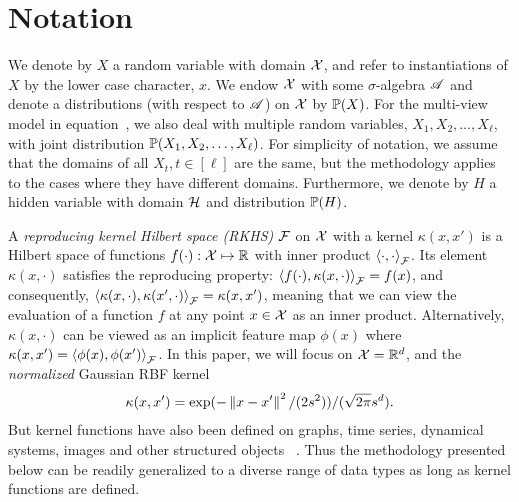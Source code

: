 \documentclass{article}
\begin{document}
\vspace{-3mm}
\section{Notation}
\vspace{-3mm}

We  denote by $X$ a random variable with domain $\mathcal{X}$,
and refer to instantiations of $X$ by the lower case character, $x$.
We endow $\mathcal{X}$ with some $\sigma$-algebra $\mathscr{A}$ and denote a distributions (with respect to $\mathscr{A}$) on $\mathcal{X}$ by $\mathbb{P}(X)$. For the multi-view model in equation~, we also deal with multiple random variables, $X_1, X_2, \ldots, X_{\ell}$, with joint distribution $\mathbb{P}(X_1,X_2,\ldots,X_{\ell})$. For simplicity of notation, we assume that the domains of all $X_t, t \in [\ell]$ are the same, but the methodology applies to the cases where they have different domains. Furthermore, we denote by $H$ a hidden variable with domain $\mathcal{H}$ and distribution $\mathbb{P}(H)$.

A \emph{reproducing kernel Hilbert space (RKHS)} $\mathcal{F}$ on $\mathcal{X}$ with a kernel $\kappa(x,x')$ is a Hilbert space of
functions $f(\cdot):\mathcal{X} \mapsto \mathbb{R}$ with inner product $\left\langle \cdot,\cdot \right\rangle_{\mathcal{F}}$. Its element $\kappa(x,\cdot)$ satisfies the reproducing property:
$\left\langle f(\cdot),\kappa(x, \cdot) \right\rangle_{\mathcal{F}} = f(x)$, and consequently, $\left\langle \kappa(x,\cdot),\kappa(x', \cdot) \right\rangle_{\mathcal{F}} = \kappa(x,x')$,
meaning that we can view the evaluation of a function $f$ at any point $x\in\mathcal{X}$ as an inner product. Alternatively, $\kappa(x,\cdot)$ can  be viewed as an implicit feature map $\phi(x)$ where $\kappa(x,x')=\left\langle \phi(x),\phi(x') \right\rangle_{\mathcal{F}}$.
In this paper, we will focus on $\mathcal{X}=\mathbb{R}^d$, and the \emph{normalized} Gaussian RBF kernel 
\begin{align}
\kappa(x,x') = \exp(- \left\|x-x'\right\|^2 / (2 s^2)) / (\sqrt{2\pi} s^d). \label{eq:normalizedrbf}
\end{align}
But kernel functions have also been defined on
graphs, time series, dynamical systems, images and other structured
objects \, \cite{SchTsuVer04}. Thus the methodology presented below can be readily generalized to a diverse range of data types as long as kernel functions are defined.
\end{document}
